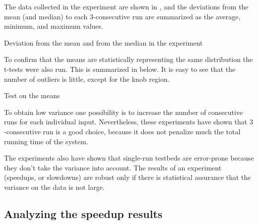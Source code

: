 The data collected in the experiment are shown in , and the deviations from the mean (and median) to each $3$-consecutive run are summarized as the average, minimum, and maximum values.

\begin{table}
  \centering
  \begin{tiny}
  
  \end{tiny}
  \caption{Deviation from the mean and from the median in the experiment}
  \label{tab:simStats}
\end{table}

To confirm that the means are statistically representing the same distribution the t-tests were also run. This is summarized in  below. It is easy to see that the number of outliers is little, except for the knob region. 

\begin{table}
  \centering
  \begin{tiny}
  
  \end{tiny}
  \caption{Test on the means}
  \label{tab:statTest}
\end{table}

To obtain low variance one possibility is to increase the number of consecutive runs for each individual input. Nevertheless, these experiments have shown that $3$-consecutive run is a good choice, because it does not penalize much the total running time of the system.

The experiments also have shown that single-run testbeds are error-prone because they don't take the variance into account. The results of an experiment (speedups, or slowdowns) are robust only if there is statistical assurance that the variance on the data is not large.


\subsection{Analyzing the speedup results}


